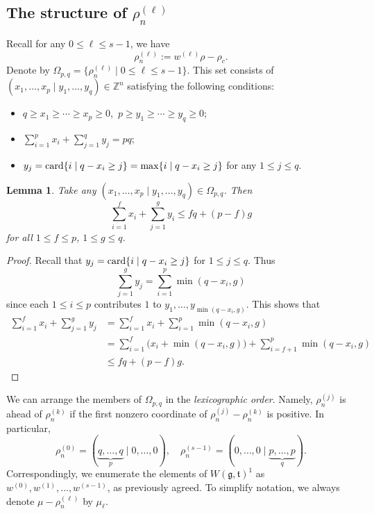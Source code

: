 \documentclass[11pt]{amsart}
\theoremstyle{plain}
\newtheorem{lemma}[thm]{Lemma}
\theoremstyle{definition}
\def\card{\mathop{\hbox {card}}\nolimits}
\newcommand{\frg}{\mathfrak{g}}
\newcommand{\frt}{\mathfrak{t}}
\newcommand{\bbZ}{\mathbb{Z}}
\begin{document}
\subsection{The structure of $\rho_n^{(\ell)}$}\label{subsec-rhon}
 Recall for any $0\leq \ell\leq s-1$, we have
 $$
 \rho_{n}^{(\ell)}:=w^{(\ell)}\rho-\rho_c.
 $$
Denote by $\Omega_{p,q}=\{\rho_n^{(\ell)}\mid 0\leq \ell\leq s-1\}$. This set consists of $(x_1, \dots, x_p \mid y_1, \dots, y_q)\in\bbZ^n$ satisfying the following conditions:	
\begin{itemize}
	\item[$\bullet$] $q\ge x_1\ge \cdots\ge x_p\ge 0$,\ $p\ge y_1\ge \cdots\ge y_q\ge 0$;
	\item[$\bullet$] $\sum_{i=1}^px_i+\sum_{j=1}^qy_j=pq$;
	\item[$\bullet$] $y_j=\card\{i\mid q-x_i\ge j\}=\max\{i\mid q-x_i\ge j\}$ for any $1\leq j\leq q$.
\end{itemize}


\begin{lemma}\label{lemma-omegapq}
	Take any $(x_1, \dots, x_p \mid y_1, \dots, y_q)\in\Omega_{p, q}$. Then
	\[\sum_{i=1}^f x_i+\sum_{j=1}^g y_i\le fq+(p-f)g\]
for all $1\le f\le p$, $1\le g\le q$.
\end{lemma}
\begin{proof}
	Recall that $y_j=\card\{i\mid q-x_i\ge j\}$ for $1\leq j\leq q$. Thus
	\[\sum_{j=1}^g y_j=\sum_{i=1}^p\min(q-x_i, g)\]
	since each  $1\leq i\leq p$ contributes $1$ to $y_1,\dots,y_{\min (q-x_i, g)}$. This shows that
	\begin{align*}
    \sum_{i=1}^f x_i+\sum_{j=1}^g y_j&=\sum_{i=1}^f x_i+\sum_{i=1}^p\min(q-x_i, g)\\
      &=\sum_{i=1}^f \big(x_i+\min(q-x_i, g)\big)+\sum_{i=f+1}^p\min(q-x_i, g)\\
      &\le fq+(p-f)g.
      \end{align*}
\end{proof}

We can arrange the members of $\Omega_{p, q}$ in the \emph{lexicographic order}. Namely, $\rho_n^{(j)}$  is ahead of $\rho_n^{(k)}$ if the first nonzero coordinate of $\rho_n^{(j)}-\rho_n^{(k)}$ is positive. In particular,
\[\rho_n^{(0)}=(\underbrace{q,\dots,q}_{p}\mid 0,\dots,0),\quad \rho_n^{(s-1)}=(0,\dots,0\mid \underbrace{p,\dots,p}_{q}).\]
Correspondingly, we enumerate the elements of $W(\frg,\frt)^1$ as $w^{(0)}, w^{(1)}, \dots, w^{(s-1)}$, as previously agreed.
To simplify notation, we always denote $\mu-\rho_n^{(\ell)}$ by $\mu_\ell$.
\end{document}
